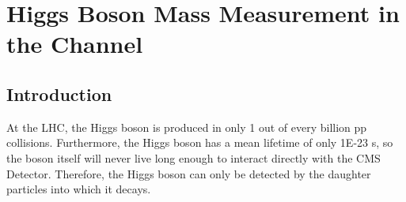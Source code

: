 \chapter{Higgs Boson Mass Measurement in the \hzzfourl Channel}\label{ch:higgs_mass}

\section{Introduction}\label{sec:higgs_intro}

At the LHC, the Higgs boson is produced in only 1 out of every billion pp collisions.
Furthermore, the Higgs boson has a mean lifetime of only 1E-23 s,
so the boson itself will never live long enough to interact directly with the CMS Detector.
Therefore, the Higgs boson can only be detected by the daughter particles into which it decays.

